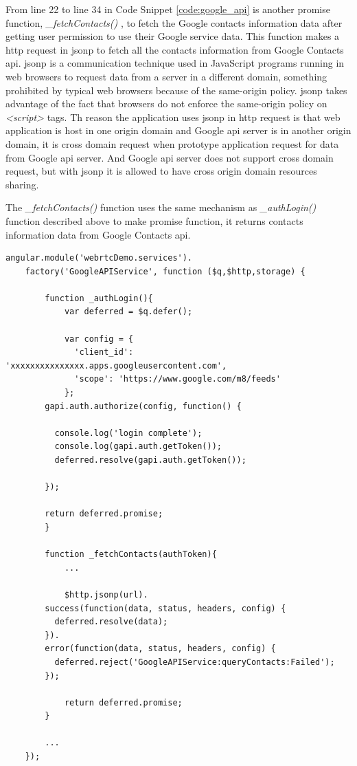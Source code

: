 \par From line 22 to line 34 in Code Snippet \ref{code:google_api} is another promise function, \textit{\_fetchContacts()} , to fetch the Google contacts information data after getting user permission to use their Google service data. This function makes a \gls{http} request in \gls{jsonp} to fetch all the contacts information from Google Contacts \gls{api}. \gls{jsonp} is a communication technique used in JavaScript programs running in web browsers to request data from a server in a different domain, something prohibited by typical web browsers because of the same-origin policy. \gls{jsonp} takes advantage of the fact that browsers do not enforce the same-origin policy on \textit{<script>} tags. Th reason the application uses \gls{jsonp} in \gls{http} request is that web application is host in one origin domain and Google \gls{api} server is in another origin domain, it is cross domain request when prototype application request for data from Google \gls{api} server. And Google \gls{api} server does not support cross domain request, but with \gls{jsonp} it is allowed to have cross origin domain resources sharing.

\par The \textit{\_fetchContacts()} function uses the same mechanism as \textit{\_authLogin()} function described above to make promise function, it returns contacts information data from Google Contacts \gls{api}.

\begin{lstlisting}[caption={GoogleAPIService.js in application client},label={code:google_api}]
angular.module('webrtcDemo.services').
	factory('GoogleAPIService', function ($q,$http,storage) {

		function _authLogin(){
			var deferred = $q.defer();

			var config = {
		      'client_id': 'xxxxxxxxxxxxxxx.apps.googleusercontent.com',
		      'scope': 'https://www.google.com/m8/feeds'
		    };
	    gapi.auth.authorize(config, function() {

	      console.log('login complete');
	      console.log(gapi.auth.getToken());
	      deferred.resolve(gapi.auth.getToken());

	    });

	    return deferred.promise;
		}

		function _fetchContacts(authToken){
			...
			
			$http.jsonp(url).
	    success(function(data, status, headers, config) {
	      deferred.resolve(data);
	    }).
	    error(function(data, status, headers, config) {
	      deferred.reject('GoogleAPIService:queryContacts:Failed');
	    });

			return deferred.promise;
		}

		...
	});
\end{lstlisting}

